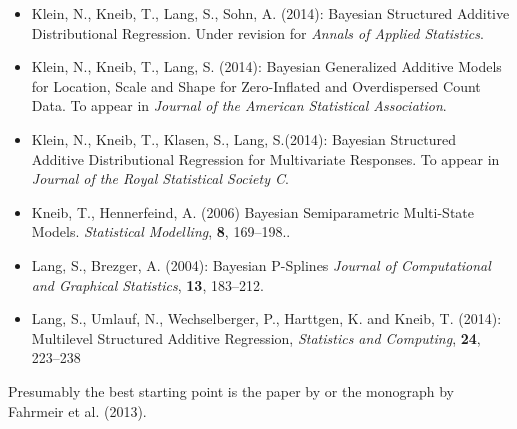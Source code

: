 \documentclass[11pt,a4paper,twoside]{bayesxarticle}
\begin{document}
\begin{itemize}
\item Klein, N., Kneib, T., Lang, S., Sohn, A. (2014): Bayesian Structured Additive Distributional Regression.  Under revision for {\it Annals of Applied Statistics}.\vspace{-0.25cm}
\item Klein, N., Kneib, T., Lang, S. (2014): Bayesian Generalized Additive Models for Location, Scale and Shape for Zero-Inflated and Overdispersed Count Data. To appear in {\it Journal of the American Statistical Association}.\vspace{-0.25cm}
\item Klein, N., Kneib, T., Klasen, S., Lang, S.(2014): Bayesian Structured Additive Distributional Regression for Multivariate Responses. To appear in {\it Journal of the Royal Statistical Society C}.\vspace{-0.25cm}
\item Kneib, T., Hennerfeind, A. (2006) Bayesian Semiparametric Multi-State Models. {\it Statistical Modelling}, {\bf 8},
    169--198..\vspace{-0.25cm}
\item Lang, S., Brezger, A. (2004): Bayesian P-Splines {\it Journal of Computational and Graphical Statistics}, {\bf 13},
    183--212.\vspace{-0.25cm}
\item Lang, S., Umlauf, N., Wechselberger, P., Harttgen, K. and Kneib, T. (2014): Multilevel Structured Additive Regression, {\it Statistics and Computing}, {\bf 24}, 223--238
\end{itemize}

Presumably the best starting point is the paper by  or the monograph by Fahrmeir et al. (2013).
\end{document}
